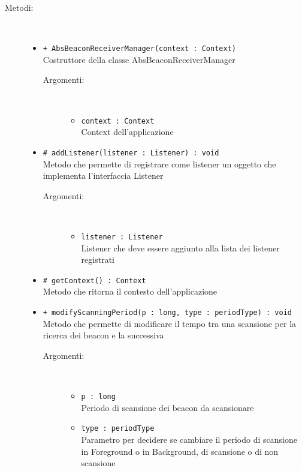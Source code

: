 \documentclass[../DefinizioneDiProdotto.tex]{subfiles}
\begin{document}
\begin{description}
\begin{itemize}
	\end{itemize}
	\item[Metodi:] \
	\begin{itemize}
		\item \texttt{+ AbsBeaconReceiverManager(context : Context)}\\
		Costruttore della classe AbsBeaconReceiverManager
		\begin{description}
			\item[Argomenti:] \
			\begin{itemize}
				\item \texttt{context : Context}\\
				Context dell'applicazione\end{itemize}
		\end{description}
		\item \texttt{\# addListener(listener : Listener) : void}\\
		Metodo che permette di registrare come listener un oggetto che implementa l'interfaccia Listener
		\begin{description}
			\item[Argomenti:] \
			\begin{itemize}
				\item \texttt{listener : Listener}\\
				Listener che deve essere aggiunto alla lista dei listener registrati\end{itemize}
		\end{description}
		\item \texttt{\# getContext() : Context}\\
		Metodo che ritorna il contesto dell'applicazione
		\item \texttt{+ modifyScanningPeriod(p : long, type : periodType) : void}\\
		Metodo che permette di modificare il tempo tra una scansione per la ricerca dei beacon e la successiva
		\begin{description}
			\item[Argomenti:] \
			\begin{itemize}
				\item \texttt{p : long}\\
				Periodo di scansione dei beacon da scansionare\item \texttt{type : periodType}\\
				Parametro per decidere se cambiare il periodo di scansione in Foreground o in Background, di scansione o di non scansione\end{itemize}

\end{description}
\end{itemize}
\end{description}
\end{document}

